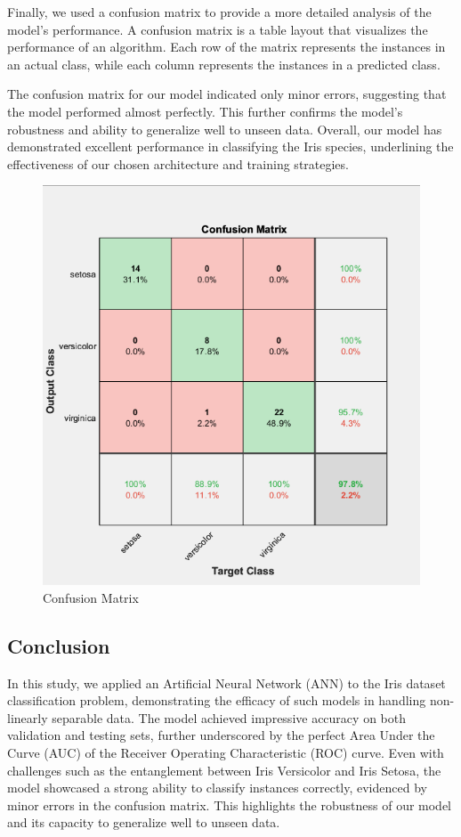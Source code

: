 \documentclass[conference]{inc/IEEEtran}
\begin{document}
Finally, we used a confusion matrix to provide a more detailed analysis of the model's performance. A confusion matrix is a table layout that visualizes the performance of an algorithm. Each row of the matrix represents the instances in an actual class, while each column represents the instances in a predicted class.

The confusion matrix for our model indicated only minor errors, suggesting that the model performed almost perfectly. This further confirms the model's robustness and ability to generalize well to unseen data. Overall, our model has demonstrated excellent performance in classifying the Iris species, underlining the effectiveness of our chosen architecture and training strategies.


\begin{figure}
  \includegraphics[width=0.7\linewidth]{figures/Cm.png}
  \caption{Confusion Matrix}
  \label{fig:boat1}
\end{figure}


\subsection{Conclusion}

In this study, we applied an Artificial Neural Network (ANN) to the Iris dataset classification problem, demonstrating the efficacy of such models in handling non-linearly separable data. The model achieved impressive accuracy on both validation and testing sets, further underscored by the perfect Area Under the Curve (AUC) of the Receiver Operating Characteristic (ROC) curve. Even with challenges such as the entanglement between Iris Versicolor and Iris Setosa, the model showcased a strong ability to classify instances correctly, evidenced by minor errors in the confusion matrix. This highlights the robustness of our model and its capacity to generalize well to unseen data.
\end{document}
